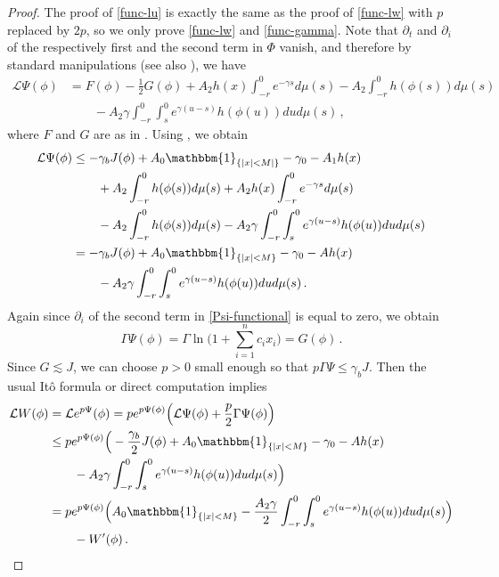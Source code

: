 \documentclass[final]{amsart}
\numberwithin{thm}{section}
\numberwithin{equation}{section}
\newcommand{\Id}{\mathbbm{1}}
\newcommand{\Ll}{\mathcal{L}}
\begin{document}
\begin{proof}
    The proof of \ref{func-lu} is exactly the same as the proof of \ref{func-lw} with $p$ replaced by $2p$, so we only prove \ref{func-lw} and \ref{func-gamma}. 
    Note that $\partial_t$ and $\partial_i$ of the respectively first and the second term in $\Phi$ vanish, and therefore by standard manipulations (see also \cite[Lemma 3.1]{functional}), we have 
    \begin{equation}
        \begin{aligned}
            \Ll \Psi(\phi) &= F(\phi) - \frac{1}{2}G(\phi) + A_2 h(x)\int_{-r}^0 e^{-\gamma s}d\mu(s) - A_2 \int^0_{-r} h(\phi(s))d\mu(s) \\
            &\qquad - A_2 \gamma \int_{-r}^0\int_s^0 e^{\gamma (u-s)} h(\phi(u)) dud\mu(s) \,,
        \end{aligned}
    \end{equation}
where $F$ and $G$ are as in . 
Using , we obtain \begin{equation}
    \begin{aligned}
        \Ll \Psi(\phi) &\leq -\gamma_bJ(\phi) + A_0\Id_{\{|x| < M|\}} - \gamma_0 - A_1h(x) \\
        &\qquad + A_2 \int^0_{-r} h(\phi(s))d\mu(s)+ A_2 h(x)\int^0_{-r} e^{-\gamma s}d\mu(s) \\
        &\qquad - A_2 \int^0_{-r} h(\phi(s))d\mu(s)
            - A_2 \gamma \int_{-r}^0\int_s^0 e^{\gamma (u-s)} h(\phi(u))dud\mu(s) \\
        &= -\gamma_bJ(\phi) + A_0\Id_{\{|x| < M\}} - \gamma_0 - Ah(x) \\
        &\qquad - A_2 \gamma \int_{-r}^0\int_s^0 e^{\gamma (u-s)} h(\phi(u))dud\mu(s) \,.
    \end{aligned}
\end{equation}
Again since $\partial_i$ of the second term in \eqref{Psi-functional} is equal to zero, we obtain
\begin{equation}\label{gamma-Psi-functional}
    \Gamma \Psi(\phi) = \Gamma \ln\Big({1 + \sum_{i=1}^n c_ix_i}\Big) = G(\phi)\,.
\end{equation}
Since $G \lesssim J$, we can choose $p > 0$ small enough so that $p\Gamma \Psi \leq \gamma_b J$. Then the usual It\^{o} formula or direct computation implies
\begin{equation}
    \begin{aligned}
        \Ll W(\phi) &= \Ll e^{p\Psi}(\phi) = pe^{p\Psi(\phi)}\Big(\Ll \Psi(\phi) + \frac{p}{2}\Gamma \Psi(\phi)\Big) \\
        &\leq pe^{p\Psi(\phi)}\Big(-\frac{\gamma_b}{2}J(\phi) + A_0\Id_{\{|x| < M\}} - \gamma_0 - Ah(x) \\
        &\qquad - A_2 \gamma \int_{-r}^0\int_s^0 e^{\gamma (u-s)} h(\phi(u))dud\mu(s)\Big) \\
        &= pe^{p\Psi(\phi)}\Big(A_0\Id_{\{|x| < M\}} - \frac{A_2\gamma}{2}\int_{-r}^0\int_s^0 e^{\gamma (u-s)} h(\phi(u))dud\mu(s)\Big) \\
        &\qquad - W'(\phi) \,.
    \end{aligned}
\end{equation}


\end{proof}
\end{document}
